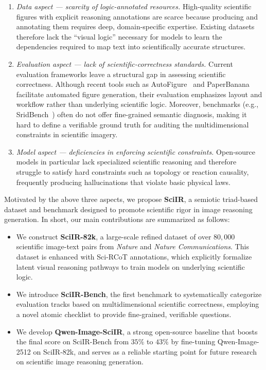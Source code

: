 \documentclass[runningheads]{llncs}
\begin{document}
\begin{enumerate}
  \item \textit{Data aspect — scarcity of logic-annotated resources.} High-quality scientific figures with explicit reasoning annotations are scarce because producing and annotating them requires deep, domain-specific expertise. Existing datasets therefore lack the ``visual logic'' necessary for models to learn the dependencies required to map text into scientifically accurate structures.
  \item \textit{Evaluation aspect — lack of scientific-correctness standards.} Current evaluation frameworks leave a structural gap in assessing scientific correctness. Although recent tools such as AutoFigure~\cite{zhu2026autofigure} and PaperBanana~\cite{zhu2026paperbanana} facilitate automated figure generation, their evaluation emphasizes layout and workflow rather than underlying scientific logic. Moreover, benchmarks (e.g., SridBench~\cite{chang2025sridbench}) often do not offer fine-grained semantic diagnosis, making it hard to define a verifiable ground truth for auditing the multidimensional constraints in scientific imagery.
  \item \textit{Model aspect — deficiencies in enforcing scientific constraints.} Open-source models in particular lack specialized scientific reasoning and therefore struggle to satisfy hard constraints such as topology or reaction causality, frequently producing hallucinations that violate basic physical laws.
\end{enumerate}

Motivated by the above three aspects, we propose \textbf{SciIR}, a semiotic triad-based dataset and benchmark designed to promote scientific rigor in image reasoning generation. 
In short, our main contributions are summarized as follows:
\begin{itemize}
  \item We construct \textbf{SciIR-82k}, a large-scale refined dataset of over $80,000$ scientific image-text pairs from \textit{Nature} and \textit{Nature Communications}. This dataset is enhanced with Sci-RCoT annotations, which explicitly formalize latent visual reasoning pathways to train models on underlying scientific logic.
  \item We introduce \textbf{SciIR-Bench}, the first benchmark to systematically categorize evaluation tracks based on multidimensional scientific correctness, employing a novel atomic checklist to provide fine-grained, verifiable questions.
  \item We develop \textbf{Qwen-Image-SciIR}, a strong open-source baseline that boosts the final score on SciIR-Bench from $35\%$ to $43\%$ by fine-tuning Qwen-Image-2512 on SciIR-82k, and serves as a reliable starting point for future research on scientific image reasoning generation.
\end{itemize}
\end{document}
